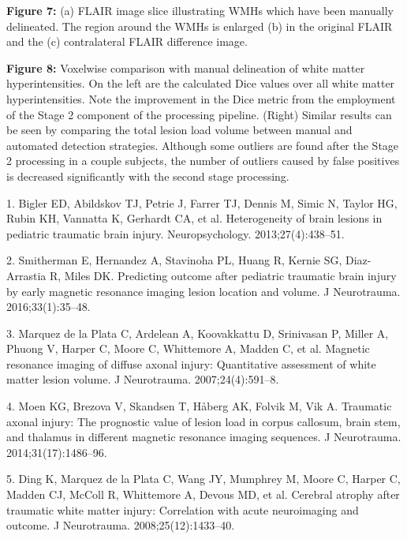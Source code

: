 \documentclass[11pt,]{article}
\begin{document}
\textbf{Figure 7:} (a) FLAIR image slice illustrating WMHs which have
been manually delineated. The region around the WMHs is enlarged (b) in
the original FLAIR and the (c) contralateral FLAIR difference image.

\textbf{Figure 8:} Voxelwise comparison with manual delineation of white
matter hyperintensities. On the left are the calculated Dice values over
all white matter hyperintensities. Note the improvement in the Dice
metric from the employment of the Stage 2 component of the processing
pipeline. (Right) Similar results can be seen by comparing the total
lesion load volume between manual and automated detection strategies.
Although some outliers are found after the Stage 2 processing in a
couple subjects, the number of outliers caused by false positives is
decreased significantly with the second stage processing.

\clearpage

\hypertarget{refs}{}
\hypertarget{ref-Bigler:2013aa}{}
1. Bigler ED, Abildskov TJ, Petrie J, Farrer TJ, Dennis M, Simic N,
Taylor HG, Rubin KH, Vannatta K, Gerhardt CA, et al. Heterogeneity of
brain lesions in pediatric traumatic brain injury. Neuropsychology.
2013;27(4):438--51.

\hypertarget{ref-Smitherman:2016aa}{}
2. Smitherman E, Hernandez A, Stavinoha PL, Huang R, Kernie SG,
Diaz-Arrastia R, Miles DK. Predicting outcome after pediatric traumatic
brain injury by early magnetic resonance imaging lesion location and
volume. J Neurotrauma. 2016;33(1):35--48.

\hypertarget{ref-Marquez-de-la-Plata:2007aa}{}
3. Marquez de la Plata C, Ardelean A, Koovakkattu D, Srinivasan P,
Miller A, Phuong V, Harper C, Moore C, Whittemore A, Madden C, et al.
Magnetic resonance imaging of diffuse axonal injury: Quantitative
assessment of white matter lesion volume. J Neurotrauma.
2007;24(4):591--8.

\hypertarget{ref-Moen:2014aa}{}
4. Moen KG, Brezova V, Skandsen T, Håberg AK, Folvik M, Vik A. Traumatic
axonal injury: The prognostic value of lesion load in corpus callosum,
brain stem, and thalamus in different magnetic resonance imaging
sequences. J Neurotrauma. 2014;31(17):1486--96.

\hypertarget{ref-Ding:2008aa}{}
5. Ding K, Marquez de la Plata C, Wang JY, Mumphrey M, Moore C, Harper
C, Madden CJ, McColl R, Whittemore A, Devous MD, et al. Cerebral atrophy
after traumatic white matter injury: Correlation with acute neuroimaging
and outcome. J Neurotrauma. 2008;25(12):1433--40.
\end{document}
